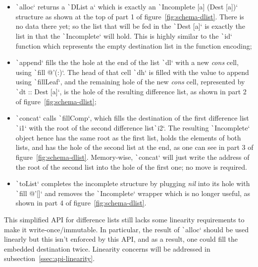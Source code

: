 \documentclass[english]{jflart}
\begin{document}
\begin{itemize}
  \item \texttt`alloc` returns a \texttt`DList a` which is exactly an \texttt`Incomplete [a] (Dest [a])` structure as shown at the top of part 1 of figure~\ref{fig:schema-dlist}. There is no data there yet; so the list that will be fed in the \texttt`Dest [a]` is exactly the list in that the \texttt`Incomplete` will hold. This is highly similar to the \texttt`id` function which represents the empty destination list in the function encoding;
  \item \texttt`append` fills the the hole at the end of the list \texttt`dl` with a new \emph{cons} cell, using \texttt`fill @'(:)`. The head of that cell \texttt`dh` is filled with the value to append using \texttt`fillLeaf`, and the remaining hole of the new \emph{cons} cell, represented by \texttt`dt :: Dest [a]`, is the hole of the resulting difference list, as shown in part 2 of figure~\ref{fig:schema-dlist};
  \item \texttt`concat` calls \texttt`fillComp`, which fills the destination of the first difference list \texttt`i1` with the root of the second difference list\texttt`i2`. The resulting \texttt`Incomplete` object hence has the same root as the first list, holds the elements of both lists, and has the hole of the second list at the end, as one can see in part 3 of figure~\ref{fig:schema-dlist}. Memory-wise, \texttt`concat` will just write the address of the root of the second list into the hole of the first one; no move is required.
  \item \texttt`toList` completes the incomplete structure by plugging \emph{nil} into its hole with \texttt`fill @'[]` and removes the \texttt`Incomplete` wrapper which is no longer useful, as shown in part 4 of figure~\ref{fig:schema-dlist}.
\end{itemize}

This simplified API for difference lists still lacks some linearity requirements to make it write-once/immutable. In particular, the result of \texttt`alloc` should be used linearly but this isn't enforced by this API, and as a result, one could fill the embedded destination twice. Linearity concerns will be addressed in subsection~\ref{ssec:api-linearity}.
\end{document}
